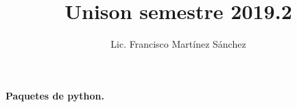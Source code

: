 \documentclass[EN]{rcftex}
\title{\large 
Unison semestre 2019.2}
\author{Lic. Francisco Martínez Sánchez}%
\begin{document}
\maketitle


%

\textcolor{azul50}{\textbf{Paquetes de python.}}




%


%


%


%


%
%

%
%

%
% 


%
%
\end{document}
